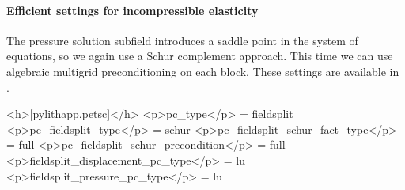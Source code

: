 \paragraph{Efficient settings for incompressible elasticity}

The pressure solution subfield introduces a saddle point in the system
of equations, so we again use a Schur complement approach. This time
we can use algebraic multigrid preconditioning on each block. These
settings are available in
.

\begin{cfg}
<h>[pylithapp.petsc]</h>
<p>pc_type</p> = fieldsplit
<p>pc_fieldsplit_type</p> = schur
<p>pc_fieldsplit_schur_fact_type</p> = full
<p>pc_fieldsplit_schur_precondition</p> = full
<p>fieldsplit_displacement_pc_type</p> = lu
<p>fieldsplit_pressure_pc_type</p> = lu
\end{cfg}


